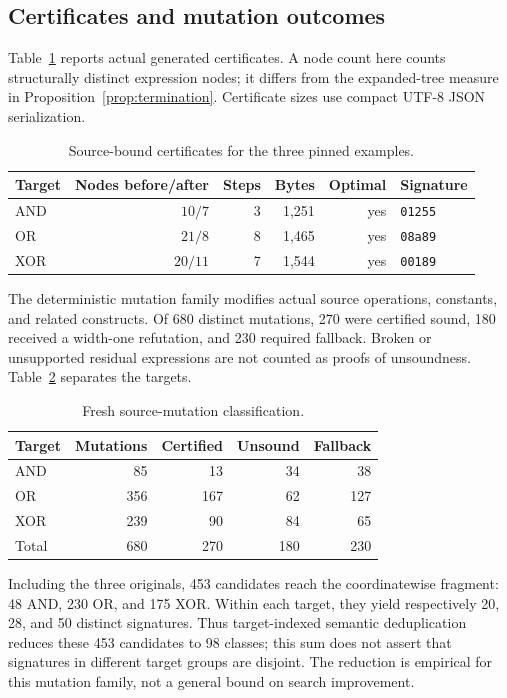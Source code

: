 \subsection{Certificates and mutation outcomes}
Table~\ref{tab:examples} reports actual generated certificates. A node count here counts structurally distinct expression nodes; it differs from the expanded-tree measure in Proposition~\ref{prop:termination}. Certificate sizes use compact UTF-8 JSON serialization.

\begin{table}[htbp]\centering\small
\begin{tabular}{@{}lrrrrl@{}}
\toprule
Target & Nodes before/after & Steps & Bytes & Optimal & Signature\\\midrule
AND & $10/7$ & 3 & 1,251 & yes & \texttt{01255}\\
OR  & $21/8$ & 8 & 1,465 & yes & \texttt{08a89}\\
XOR & $20/11$ & 7 & 1,544 & yes & \texttt{00189}\\
\bottomrule
\end{tabular}
\caption{Source-bound certificates for the three pinned examples.}\label{tab:examples}
\end{table}

The deterministic mutation family modifies actual source operations, constants, and related constructs. Of 680 distinct mutations, 270 were certified sound, 180 received a width-one refutation, and 230 required fallback. Broken or unsupported residual expressions are not counted as proofs of unsoundness. Table~\ref{tab:mutations} separates the targets.

\begin{table}[htbp]\centering\small
\begin{tabular}{@{}lrrrr@{}}
\toprule
Target & Mutations & Certified & Unsound & Fallback\\\midrule
AND & 85 & 13 & 34 & 38\\
OR & 356 & 167 & 62 & 127\\
XOR & 239 & 90 & 84 & 65\\\midrule
Total & 680 & 270 & 180 & 230\\
\bottomrule
\end{tabular}
\caption{Fresh source-mutation classification.}\label{tab:mutations}
\end{table}

Including the three originals, 453 candidates reach the coordinatewise fragment: 48 AND, 230 OR, and 175 XOR. Within each target, they yield respectively 20, 28, and 50 distinct signatures. Thus target-indexed semantic deduplication reduces these 453 candidates to 98 classes; this sum does not assert that signatures in different target groups are disjoint. The reduction is empirical for this mutation family, not a general bound on search improvement.

